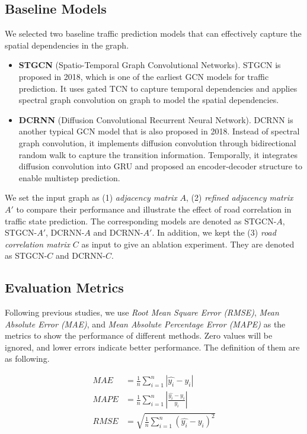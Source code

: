 \subsection{Baseline Models}
We selected two baseline traffic prediction models that can effectively capture the spatial dependencies in the graph.

\begin{itemize}
    \item \textbf{STGCN}\cite{STGCN} (Spatio-Temporal Graph Convolutional Networks). STGCN is proposed in 2018, which is one of the earliest GCN models for traffic prediction. It uses gated TCN\cite{TCN} to capture temporal dependencies and applies spectral graph convolution\cite{GCN0} on graph to model the spatial dependencies.
    \item \textbf{DCRNN}\cite{DCRNN} (Diffusion Convolutional Recurrent Neural Network). DCRNN is another typical GCN model that is also proposed in 2018. Instead of spectral graph convolution, it implements diffusion convolution through bidirectional random walk to capture the transition information. Temporally, it integrates diffusion convolution into GRU and proposed an encoder-decoder structure to enable multistep prediction.
\end{itemize}

We set the input graph as (1) \textit{adjacency matrix} $A$, (2) \textit{refined adjacency matrix} $A'$ to compare their performance and illustrate the effect of road correlation in traffic state prediction. The corresponding models are denoted as STGCN-$A$, STGCN-$A'$, DCRNN-$A$ and DCRNN-$A'$. In addition, we kept the (3) \textit{road correlation matrix} $C$ as input to give an ablation experiment. They are denoted as STGCN-$C$ and DCRNN-$C$.

\subsection{Evaluation Metrics}
Following previous studies, we use \textit{Root Mean Square Error (RMSE)}, \textit{Mean Absolute Error (MAE)}, and \textit{Mean Absolute Percentage Error (MAPE)} as the metrics to show the performance of different methods. Zero values will be ignored, and lower errors indicate better performance. The definition of them are as following.

\begin{equation}
    \begin{aligned}
        MAE&=\frac 1n\sum_{i=1}^n|\hat{y_i}-y_i|\\
        MAPE&=\frac 1n\sum_{i=1}^n|\frac{\hat{y_i}-y_i}{y_i}|\\
        RMSE&=\sqrt{\frac 1n\sum_{i=1}^n(\hat{y_i}-y_i)^2}
    \end{aligned}
\end{equation}

